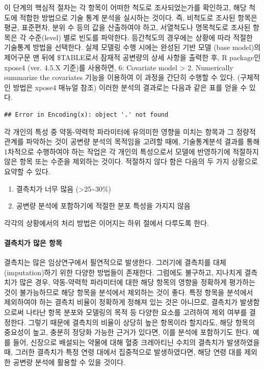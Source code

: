 \documentclass[
  10pt,
]{krantz}
\begin{document}
이 단계의 핵심적 절차는 각 항목이 어떠한 척도로 조사되었는가를 확인하고, 해당 척도에 적합한 방법으로 기술 통계 분석을 실시하는 것이다. 즉, 비척도로 조사된 항목은 평균, 표준편차, 분위 수 등의 값을 산출하여야 하고, 서열척도나 명목척도로 조사된 항목은 각 수준(level) 별로 빈도를 파악한다. 등간척도의 경우에는 상황에 따라 적절한 기술통계 방법을 선택한다. 실제 모델링 수행 시에는 완성된 기반 모델 (base model)의 제어구문 맨 뒤에 \$TABLE로서 잠재적 공변량의 상세 사항을 출력한 후, R package인 xpose4 (ver. 4.5.X 기준)를 사용하면, 6: Covariate model \textgreater{} 2. Numerically summarize the covariates 기능을 이용하여 이 과정을 간단히 수행할 수 있다. (구체적인 방법은 xpose4 매뉴얼 참조) 이러한 분석의 결과로는 다음과 같은 표를 얻을 수 있다.

\begin{verbatim}
## Error in Encoding(x): object '.' not found
\end{verbatim}



각 개인의 특성 중 약동-약력학 파라미터에 유의미한 영향을 미치는 항목과 그 정량적 관계를 파악하는 것이 공변량 분석의 목적임을
고려할 때에, 기술통계분석 결과를 통해 1차적으로 수행하여야 하는 작업은 각 개인의 특성으로서 모델에 반영하기에 적절하지 않은
항목 또는 수준을 제외하는 것이다. 적절하지 않다 함은 다음의 두 가지 상황으로 요약할 수 있다.

\begin{enumerate}
\def\labelenumi{\arabic{enumi})}
\item
  결측치가 너무 많음 (\textgreater25\textasciitilde30\%)
\item
  공변량 분석에 포함하기에 적절한 분포 특성을 가지지 않음
\end{enumerate}

각각의 상황에서의 처리 방법은 이어지는 하위 절에서 다루도록 한다.

\hypertarget{uxacb0uxce21uxce58uxac00-uxb9ceuxc740-uxd56duxbaa9}{%
\paragraph{결측치가 많은 항목}\label{uxacb0uxce21uxce58uxac00-uxb9ceuxc740-uxd56duxbaa9}}

결측치는 많은 임상연구에서 필연적으로 발생한다. 그러기에 결측치를 대체(imputation)하기 위한 다양한 방법들이 존재한다.
그럼에도 불구하고, 지나치게 결측치가 많은 경우, 약동-약력학 파라미터에 대한 해당 항목의 영향을 정확하게 평가하는 것이
불가능하므로 해당 항목을 분석에서 제외하는 것이 좋다. 특정 항목을 분석에서 제외하여야 하는 결측치 비율이 정확하게
정해져 있는 것은 아니므로, 결측치가 발생함으로써 나타난 항목 분포와 모델링의 목적 등 다양한 요소를 고려하여 제외 여부를
결정한다. 그렇기 때문에 결측치의 비율이 상당히 높은 항목이라 할지라도, 해당 항목의 중요성이 높고, 충분히 정당화 가능한 근거가
있다면, 이를 분석에 포함하기도 한다. 예를 들어, 신장으로 배설되는 약물에 대해 혈중 크레아티닌 수치의 결측치가 발생하였을 때,
그러한 결측치가 특정 연령 대에서 집중적으로 발생하였다면, 해당 연령 대를 제외한 공변량 분석에 활용할 수 있을 것이다.
\end{document}
